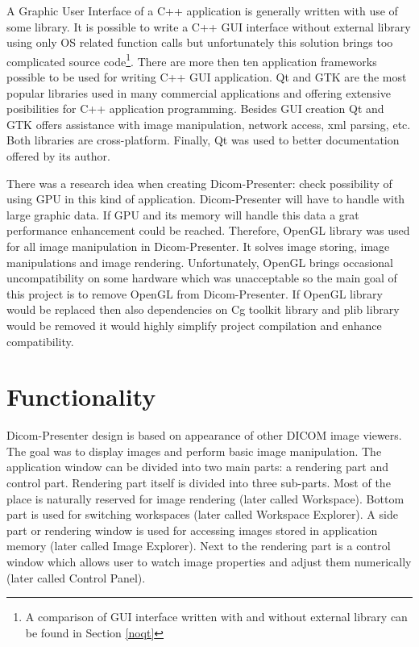 A Graphic User Interface of a C++ application is generally written with use of some library. It is possible to write a C++ GUI interface without external library using only OS related function calls but unfortunately this solution brings too complicated source code\footnote{A comparison of GUI interface written with and without external library can be found in Section \ref{noqt}}. There are more then ten application frameworks possible to be used for writing C++ GUI application. Qt and GTK are the most popular libraries used in many commercial applications and offering extensive posibilities for C++ application programming\cite{wikipedia}. Besides GUI creation Qt and GTK offers assistance with image manipulation, network access, xml parsing, etc. Both libraries are cross-platform. Finally, Qt was used to better documentation offered by its author.

There was a research idea when creating Dicom-Presenter: check possibility of using GPU in this kind of application. Dicom-Presenter will have to handle with large graphic data. If GPU and its memory will handle this data a grat performance enhancement could be reached. Therefore, OpenGL library was used for all image manipulation in Dicom-Presenter. It solves image storing, image manipulations and image rendering. Unfortunately, OpenGL brings 
occasional uncompatibility on some hardware which was unacceptable so the main goal of this project is to remove OpenGL from Dicom-Presenter. If OpenGL library would be replaced then also dependencies on Cg toolkit library and plib library would be removed it would highly simplify project compilation and enhance compatibility.



\section{Functionality}
Dicom-Presenter design is based on appearance of other DICOM image viewers. The goal was to display images and perform basic image manipulation. The application window can be divided into two main parts: a rendering part and control part. Rendering part itself is divided into three sub-parts. Most of the place is naturally reserved for image rendering (later called Workspace). Bottom part is used for switching workspaces (later called Workspace Explorer). A side part or rendering window is used for accessing images stored in application memory (later called Image Explorer). Next to the rendering part is a control window which allows user to watch image  properties and adjust them numerically (later called Control Panel). 

